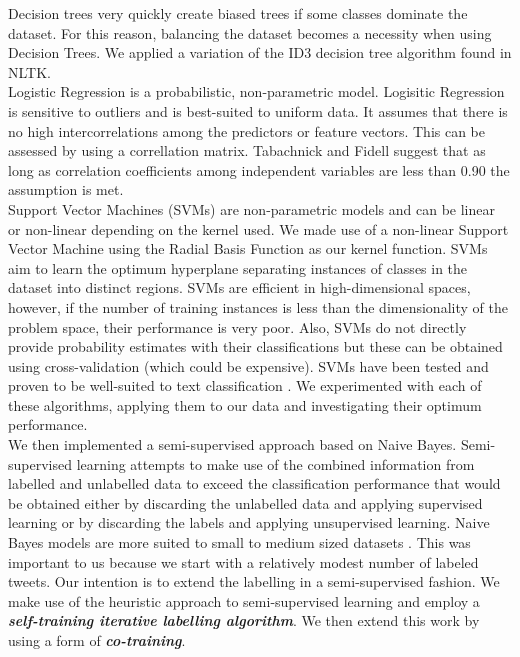 \documentclass[10pt,letterpaper]{article}
\begin{document}
Decision trees very quickly create biased trees if some classes dominate the dataset. For this reason, balancing the dataset becomes a necessity when using Decision Trees. We applied a variation of the ID3 decision tree algorithm found in NLTK.\\

Logistic Regression is a probabilistic, non-parametric model. Logisitic Regression is sensitive to outliers and is best-suited to uniform data. It assumes that there is no high intercorrelations among the predictors or feature vectors. This can be assessed by using a correllation matrix. Tabachnick and Fidell  \cite{REF87} suggest that as long as correlation coefficients among independent variables are less than 0.90 the assumption is met.\\

Support Vector Machines (SVMs) are non-parametric models and can be linear or non-linear depending on the kernel used. We made use of a non-linear Support Vector Machine using the Radial Basis Function as our kernel function. SVMs aim to learn the optimum hyperplane separating instances of classes in the dataset into distinct regions. SVMs are efficient in high-dimensional spaces, however, if the number of training instances is less than the dimensionality of the problem space, their performance is very poor. Also, SVMs do not directly provide probability estimates with their classifications but these can be obtained using cross-validation (which could be expensive). SVMs have been tested and proven to be well-suited to text classification \cite{REF88}. We experimented with each of these algorithms, applying them to our data and investigating their optimum performance.\\ 
%
We then implemented a semi-supervised approach based on Naive Bayes. Semi-supervised learning attempts to make use of the combined information from labelled and unlabelled data to exceed the classification performance that would be obtained either by discarding the unlabelled data and applying supervised learning or by discarding the labels and applying unsupervised learning.  Naive Bayes models are more suited to small to medium sized datasets \cite{REF61}. This was important to us because we start with a relatively modest number of labeled tweets.  Our intention is to extend the labelling in a semi-supervised fashion. We make use of the heuristic approach to semi-supervised learning and employ a \textbf{\textit{self-training iterative labelling algorithm}}. We then extend this work by using a form of \textbf{\textit{co-training}}.
\end{document}
